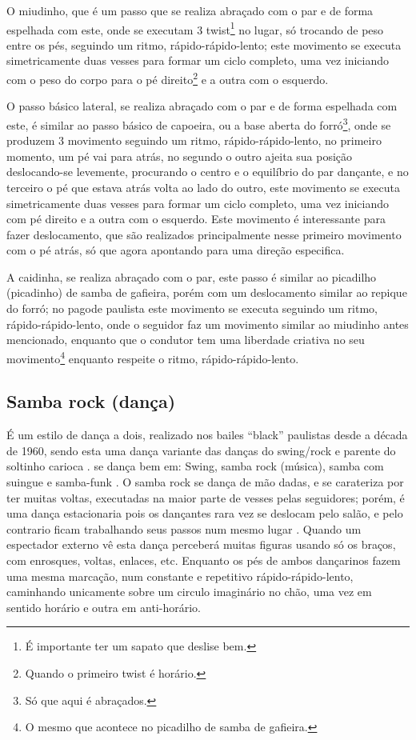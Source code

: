 O miudinho, que é um passo que se realiza abraçado com o par e de forma espelhada com este,
onde se executam 3 twist\footnote{É importante ter um sapato que deslise bem.} no lugar, 
só trocando de peso entre os pés, seguindo um ritmo, rápido-rápido-lento;
este movimento se executa simetricamente duas vesses para formar um ciclo completo,  
uma vez iniciando com o peso do corpo para o pé direito\footnote{Quando o primeiro twist é horário.} e a outra com o esquerdo.

O passo básico lateral, se realiza abraçado com o par  e de forma espelhada com este, 
é similar ao passo básico de capoeira,
ou a base aberta do forró\footnote{Só que aqui é abraçados.},
onde se produzem 3 movimento seguindo um ritmo, rápido-rápido-lento,
no primeiro momento, um pé vai para atrás, 
no segundo o outro ajeita sua posição deslocando-se levemente, 
procurando o centro e o equilíbrio do par dançante, e
no terceiro o pé que estava atrás volta ao lado do outro,
este movimento se executa simetricamente duas vesses para formar um ciclo completo,  
uma vez iniciando com pé direito e a outra com o esquerdo.
Este movimento é interessante para fazer deslocamento, 
que são realizados principalmente nesse primeiro movimento com o pé atrás, 
só que agora apontando para uma direção especifica.

A caidinha, se realiza abraçado com o par, 
este passo é similar ao picadilho (picadinho) de samba de gafieira,
porém com um deslocamento similar ao repique do forró;
no pagode paulista este movimento se executa seguindo um ritmo, rápido-rápido-lento,
onde o seguidor faz um movimento similar ao miudinho antes mencionado,
enquanto que o condutor tem uma liberdade criativa no 
seu movimento\footnote{O mesmo que acontece no picadilho de samba de gafieira.} 
enquanto respeite o ritmo, rápido-rápido-lento.

\subsection{Samba rock (dança)}
É um estilo de dança a dois, realizado nos bailes ``black'' paulistas desde a década de 1960, 
sendo esta uma dança variante das danças do swing/rock e parente do soltinho carioca \cite[pp. 135]{perna2002samba}.
se dança bem em: Swing, samba rock (música), samba com suingue e samba-funk \cite[pp. 135,138]{perna2002samba}.
O samba rock se dança de mão dadas, e se carateriza por ter muitas voltas,
executadas na maior parte de vesses pelas  seguidores;
porém, é uma dança estacionaria pois os dançantes rara vez se deslocam pelo salão, 
e pelo contrario ficam trabalhando seus passos num mesmo lugar  \cite[pp. 135,138]{perna2002samba}.
Quando um espectador externo vê esta dança perceberá muitas figuras usando só os braços,
com enrosques, voltas, enlaces, etc.
Enquanto os pés de ambos dançarinos fazem uma mesma marcação, num constante e repetitivo rápido-rápido-lento,
caminhando unicamente sobre um circulo imaginário no chão, uma vez em sentido horário e outra em anti-horário.

